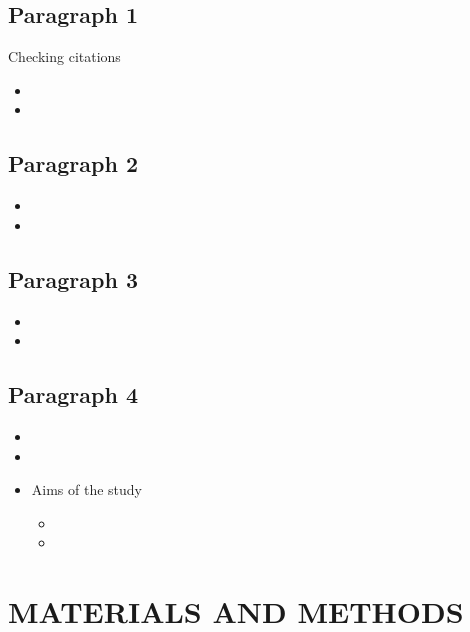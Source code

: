 \documentclass[letterpaper, 12pt]{article}
\begin{document}
\subsection*{Paragraph 1}
Checking citations \citep{rieseberg_chromosomal_2001, petit_glacial_2003, rellstab_practical_2015}

\begin{itemize}
    \item 
    \item
\end{itemize}


\subsection*{Paragraph 2}

\begin{itemize}
    \item 
    \item
\end{itemize}

\subsection*{Paragraph 3}

\begin{itemize}
    \item 
    \item
\end{itemize}

\subsection*{Paragraph 4}

\begin{itemize}
    \item 
    \item
\end{itemize}


\begin{itemize}
    \item Aims of the study 
\begin{itemize}
    \item 
    \item
\end{itemize}
\end{itemize}


\section*{MATERIALS AND METHODS}
\end{document}
